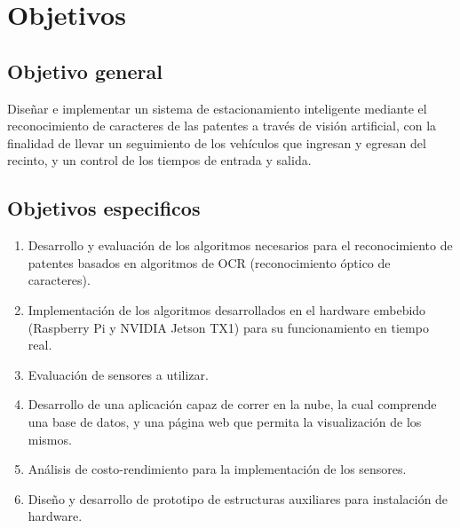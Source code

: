 \section{Objetivos}

\subsection{Objetivo general}

Diseñar e implementar un sistema de estacionamiento inteligente mediante el reconocimiento de caracteres de las patentes a través de visión artificial, con la finalidad de llevar un seguimiento de los vehículos que ingresan y egresan del recinto, y un control de los tiempos de entrada y salida.

\subsection{Objetivos especificos}

\begin{enumerate}
    \item Desarrollo y evaluación de los algoritmos necesarios para el reconocimiento de patentes basados en algoritmos de OCR (reconocimiento óptico de caracteres).
    \item Implementación de los algoritmos desarrollados en el hardware embebido (Raspberry Pi y NVIDIA Jetson TX1) para su funcionamiento en tiempo real.
    \item Evaluación de sensores a utilizar.
    \item Desarrollo de una aplicación capaz de correr en la nube, la cual comprende una base de datos, y una página web que permita la visualización de los mismos.
    \item Análisis de costo-rendimiento para la implementación de los sensores.
    \item Diseño y desarrollo de prototipo de estructuras auxiliares para instalación de hardware.
\end{enumerate}






